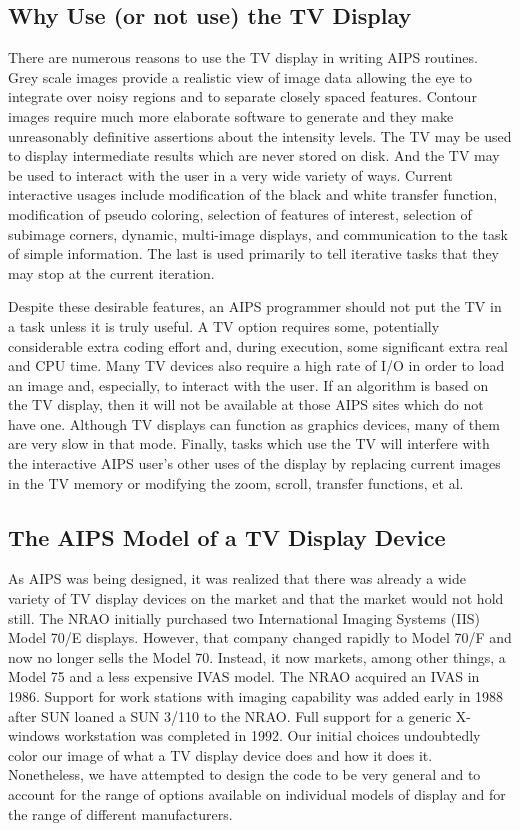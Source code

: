 \subsection{Why Use (or not use) the TV Display}
There are numerous reasons to use the TV display in writing AIPS
routines.  Grey scale images provide a realistic view of image
data allowing the eye to integrate over noisy regions and to separate
closely spaced features.  Contour images require much more elaborate
software to generate and they make unreasonably definitive assertions
about the intensity levels.  The TV may be used to display
intermediate results which are never stored on disk. And the TV may be
used to interact with the user in a very wide variety of ways. Current
interactive usages include modification of the black and white
transfer function, modification of pseudo coloring, selection of
features of interest, selection of subimage corners, dynamic,
multi-image displays, and communication to the task of simple
information.  The last is used primarily to tell iterative tasks that
they may stop at the current iteration.

Despite these desirable features, an AIPS programmer should not put
the TV in a task unless it is truly useful.  A TV option requires
some, potentially considerable extra coding effort and, during
execution, some significant extra real and CPU time.  Many TV devices
also require a high rate of I/O in order to load an image and,
especially, to interact with the user.  If an algorithm is based on
the TV display, then it will not be available at those AIPS sites
which do not have one.  Although TV displays can function as graphics
devices, many of them are very slow in that mode.  Finally, tasks
which use the TV will interfere with the interactive AIPS user's other
uses of the display by replacing current images in the TV memory or
modifying the zoom, scroll, transfer functions, et al.

\subsection{The AIPS Model of a TV Display Device}
As AIPS was being designed, it was realized that there was already a
wide variety of TV display devices on the market and that the market
would not hold still.  The NRAO initially purchased two International
Imaging Systems (IIS) Model 70/E displays.  However, that company
changed rapidly to Model 70/F and now no longer sells the Model 70.
Instead, it now markets, among other things, a Model 75 and a less
expensive IVAS model.  The NRAO acquired an IVAS in 1986.  Support
for work stations with imaging capability was added early in 1988
after SUN loaned a SUN 3/110 to the NRAO.  Full support for a
generic X-windows workstation was completed in 1992.  Our initial choices
undoubtedly color our image of what a TV display device does and how
it does it.  Nonetheless, we have attempted to design the code to be
very general and to account for the range of options available on
individual models of display and for the range of different
manufacturers.


